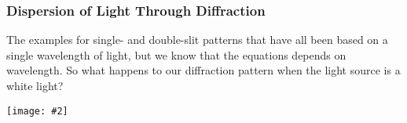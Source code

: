 \documentclass[compress,aspectratio=169]{beamer}
\newcommand{\pic}[2]{\texttt{[image: \#2]}}
\begin{document}
\begin{frame}
  \frametitle{Dispersion of Light Through Diffraction}
  The examples for single- and double-slit patterns that have all been based on
  a single wavelength of light, but we know that the equations depends on
  wavelength. So what happens to our diffraction pattern when the light source
  is a white light?
  \begin{center}
    \pic{.6}{Diffraction.png}
  \end{center}
\end{frame}

%
%
\end{document}
